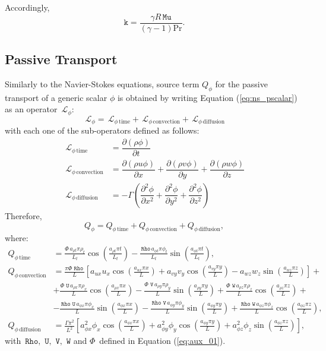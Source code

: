 \documentclass[10pt]{article}
\newcommand{\Diff}[2] {\dfrac{\partial( #1)}{\partial #2}}
\newcommand{\diff}[2] {\dfrac{\partial #1}{\partial #2}}
\newcommand{\Rho}{\,\mathtt{Rho}}
\newcommand{\U}{\,\mathtt{U}}
\newcommand{\V}{\,\mathtt{V}}
\newcommand{\W}{\,\mathtt{W}}
\newcommand{\Lo}{\,\mathcal{L}}
\newcommand{\Mu}{\,\mathtt{Mu}}
\newcommand{\convection}{\text{convection}}
\begin{document}
Accordingly,
$$\texttt{k}=\dfrac{\gamma R \Mu}{(\gamma-1)\text{Pr}}.$$



\subsection{Passive Transport}
Similarly to the Navier-Stokes equations, source term $Q_\phi$ for the passive transport of a generic scalar $\phi$ is obtained by writing Equation (\ref{eq:ns_pscalar}) as an operator $\Lo_\phi$:
 $$\Lo_\phi = \Lo_{\phi \, \text{time}}+\Lo_{\phi \, \convection}+\Lo_{\phi \, \text{diffusion}}$$
with each one of the sub-operators defined as follows:
\begin{equation*}
 \begin{split}
\Lo_{\phi \, \text{time}}&= \Diff{\rho\phi}{t} \\
\Lo_{\phi \, \convection}&= \Diff{\rho u \phi}{x} + \Diff{\rho v \phi}{y} + \Diff{\rho w \phi}{z}\\
\Lo_{\phi \,\text{diffusion}}&= - \Gamma \left( \diff{^2 \phi}{x^2} +\diff{^2 \phi}{y^2} + \diff{^2 \phi}{z^2} \right)
 \end{split}
\end{equation*}
%
Therefore, $$Q_\phi = Q_{\phi \, \text{time}}+Q_{\phi \, \convection}+Q_{\phi \, \text{diffusion}},$$
where:
\begin{equation}
 \begin{split}
 Q_{\phi \, \text{time}}&= 
\frac{\Phi \,  a_{\rho t} \pi \rho_{t} }{L_t}\cos\left(\frac{a_{\rho t} \pi t}{L_t}\right) - \frac{\Rho \, a_{\phi t} \pi \phi_{t} }{L_t}\sin\left(\frac{a_{\phi t} \pi t}{L_t}\right), \\
%
%
 Q_{\phi \, \text{convection}}&= 
\frac{\pi \Phi \,  \Rho \, }{L} \left[a_{ux} u_{x} \cos\left(\frac{a_{ux} \pi x}{L}\right) + a_{vy} v_{y} \cos\left(\frac{a_{vy} \pi y}{L}\right) - a_{wz} w_{z} \sin\left(\frac{a_{wz} \pi z}{L}\right)\right]+ \\ 
&+ \frac{\Phi \,  \U \, a_{\rho x} \pi \rho_{x} }{L}\cos\left(\frac{a_{\rho x} \pi x}{L}\right) - \frac{\Phi \,  \V \, a_{\rho y} \pi \rho_{y} }{L}\sin\left(\frac{a_{\rho y} \pi y}{L}\right) + \frac{\Phi \,  \W \, a_{\rho z} \pi \rho_{z} }{L}\cos\left(\frac{a_{\rho z} \pi z}{L}\right) + \\ 
&- \frac{ \Rho \, \U \, a_{\phi x} \pi\phi_{x} }{L}\sin\left(\frac{a_{\phi x} \pi x}{L}\right) - \frac{\Rho \, \V \, a_{\phi y} \pi \phi_{y} }{L}\sin\left(\frac{a_{\phi y} \pi y}{L}\right)+ \frac{\Rho \, \W \, a_{\phi z} \pi \phi_{z} }{L}\cos\left(\frac{a_{\phi z} \pi z}{L}\right) , \\
%
%
 Q_{\phi \, \text{diffusion}}&= 
\frac{\Gamma \pi^{2} }{L^2} \left[a_{\phi x}^{2} \phi_{x} \cos\left(\frac{a_{\phi x} \pi x}{L}\right) + a_{\phi y}^{2} \phi_{y} \cos\left(\frac{a_{\phi y} \pi y}{L}\right) + a_{\phi z}^{2} \phi_{z} \sin\left(\frac{a_{\phi z} \pi z}{L}\right)\right],
 \end{split}
\end{equation}
with $\Rho,\,\U,\,\V,\,\W$ and $\Phi \, $ defined in Equation (\ref{eq:aux_01}).
\end{document}
